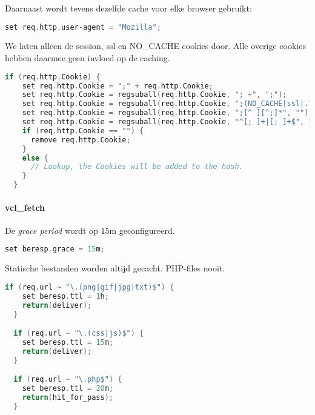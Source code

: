 Daarnaast wordt tevens dezelfde cache voor elke browser gebruikt:

\begin{lstlisting}[language=C]
  set req.http.user-agent = "Mozilla";
\end{lstlisting}

We laten alleen de session, ssl en NO\_CACHE cookies door. Alle overige cookies hebben daarmee geen invloed op de caching.

\begin{lstlisting}[language=C]
  if (req.http.Cookie) {
    set req.http.Cookie = ";" + req.http.Cookie;
    set req.http.Cookie = regsuball(req.http.Cookie, "; +", ";");
    set req.http.Cookie = regsuball(req.http.Cookie, ";(NO_CACHE|ssl|.?SESS[^=]+)=", "; \1=");
    set req.http.Cookie = regsuball(req.http.Cookie, ";[^ ][^;]*", "");
    set req.http.Cookie = regsuball(req.http.Cookie, "^[; ]+|[; ]+$", "");
    if (req.http.Cookie == "") {
      remove req.http.Cookie;
    }
    else {
      // Lookup, the Cookies will be added to the hash.
    }
  }
\end{lstlisting}

\paragraph{vcl\_fetch}

De \textit{grace period} wordt op 15m geconfigureerd.

\begin{lstlisting}[language=C]
  set beresp.grace = 15m;
\end{lstlisting}

Statische bestanden worden altijd gecacht. PHP-files nooit.

\begin{lstlisting}[language=C]
  if (req.url ~ "\.(png|gif|jpg|txt)$") {
    set beresp.ttl = 1h;
    return(deliver);
  }

  if (req.url ~ "\.(css|js)$") {
    set beresp.ttl = 15m;
    return(deliver);
  }

  if (req.url ~ "\.php$") {
    set beresp.ttl = 20m;
    return(hit_for_pass);
  }
\end{lstlisting}


